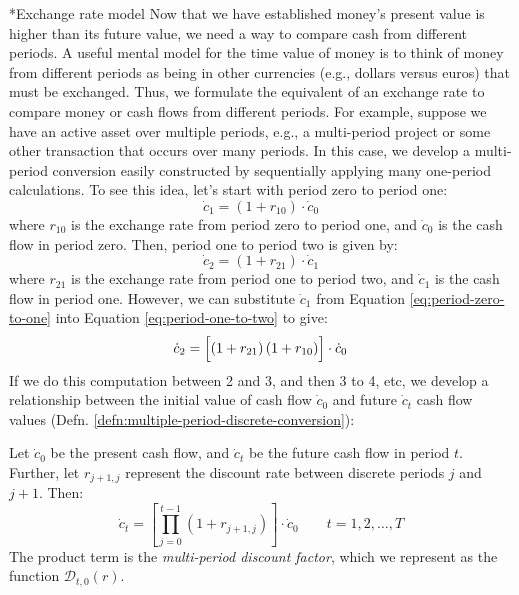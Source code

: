 \documentclass[11pt]{article}
\makeatletter
\theoremstyle{definition}
\renewcommand\subsection{\@startsection
	{subsection}{2}{0mm}
	{-0.05in}
	{-0.5\baselineskip}
	{\normalfont\normalsize\bfseries}}
\makeatother
\begin{document}
\subsection*{Exchange rate model}
Now that we have established money’s present value is higher than its future value, we need a way to compare cash from different periods. 
A useful mental model for the time value of money is to think of money from different periods 
as being in other currencies (e.g., dollars versus euros) that must be exchanged. 
Thus, we formulate the equivalent of an exchange rate to compare money or cash flows from different periods. 
For example, suppose we have an active asset over multiple periods, e.g., a multi-period project or some other transaction that occurs over many periods. 
In this case, we develop a multi-period conversion easily constructed by sequentially applying many one-period calculations. 
To see this idea, let's start with period zero to period one:
\begin{equation}\label{eq:period-zero-to-one}
\dot{c}_{1} = \left(1+r_{10}\right)\cdot\dot{c}_{0}
\end{equation}
where $r_{10}$ is the exchange rate from period zero to period one, and $\dot{c}_{0}$ is the cash flow in period zero.
Then, period one to period two is given by:
\begin{equation}\label{eq:period-one-to-two}
\dot{c}_{2} = \left(1+r_{21}\right)\cdot\dot{c}_{1}
\end{equation}
where $r_{21}$ is the exchange rate from period one to period two, and $\dot{c}_{1}$ is the cash flow in period one. 
However, we can substitute $\dot{c}_{1}$ from Equation \ref{eq:period-zero-to-one} into Equation \ref{eq:period-one-to-two} to give:
\begin{equation}\label{eq:period-one-to-two-substituted}
\dot{c}_{2} = \Bigl[\left(1+r_{21}\right)\left(1+r_{10}\right)\Bigr]\cdot\dot{c}_{0}
\end{equation}
If we do this computation between 2 and 3, and then 3 to 4, etc, we develop a relationship between the initial value of cash flow 
$\dot{c}_{0}$ and future $\dot{c}_{t}$ cash flow values (Defn. \ref{defn:multiple-period-discrete-conversion}):

\begin{definition}\label{defn:multiple-period-discrete-conversion}
Let $\dot{c}_0$ be the present cash flow, and $\dot{c}_t$ be the future cash flow in period $t$. 
Further, let $r_{j+1,j}$ represent the discount rate between discrete periods $j$ and $j+1$. Then: 
\begin{equation}
\dot{c}_{t} = \left[\prod_{j=0}^{t-1}\left(1+r_{j+1,j}\right)\right]\cdot\dot{c}_{0}\qquad{t=1,2,\dots,T}
\end{equation}
The product term is the \textit{multi-period discount factor}, which we represent as the function $\mathcal{D}_{t,0}(r)$.
\end{definition}
\end{document}
